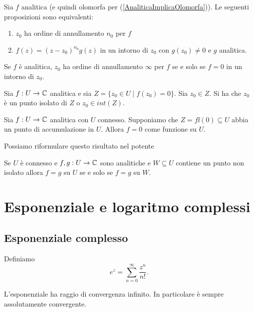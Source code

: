 \begin{multicols*}{2}
\begin{lemma}\label{CaratterizzazioneOrdineDiAnnullamento}
Sia $f$ analitica (e quindi olomorfa per (\ref{AnaliticaImplicaOlomorfa})). Le seguenti proposizioni sono equivalenti:
\begin{enumerate}[noitemsep]
\item $z_0$ ha ordine di annullamento $n_0$ per $f$
\item $f(z)=(z-z_0)^{n_0}g(z)$ in un intorno di $z_0$ con $g(z_0)\neq 0$ e $g$ analitica.
\end{enumerate}
\end{lemma}

\begin{remark}
Se $f$ \`e analitica, $z_0$ ha ordine di annullamento $\infty$ per $f$ se e solo se $f=0$ in un intorno di $z_0$.
\end{remark}


\begin{lemma}\label{ZeriAnaliticaSonoIsolatiOIntornoNullo}
Sia $f:U\to \mathbb{C}$ analitica e sia $Z=\{z_0\in U\mid f(z_0)=0\}$. Sia $z_0\in Z$. Si ha che $z_0$ \`e un punto isolato di $Z$ o $z_0\in int(Z)$.
\end{lemma}

\begin{theorem}\label{ZeriDiAnaliticaSonoIsolatiOCopronoLaComponenteConnessa}
Sia $f:U\to\mathbb{C}$ analitica con $U$ connesso. Supponiamo che $Z=f\ii(0)\subseteq U$ abbia un punto di accumulazione in $U$. Allora $f=0$ come funzione su $U$.
\end{theorem}
\noindent
Possiamo riformulare questo risultato nel potente
\begin{corollary}\label{LuogoDoveAnaliticheCoincidonoSonoIsolatiOCopronoLaComponenteConnessa}
Se $U$ \`e connesso e $f,g:U\to \mathbb{C}$ sono analitiche e $W\subseteq U$ contiene un punto non isolato allora $f=g$ su $U$ se e solo se $f=g$ su $W$.
\end{corollary}

\section{Esponenziale e logaritmo complessi}
\subsection{Esponenziale complesso}
\begin{definition}
Definiamo
\[e^z=\sum_{n=0}^\infty \frac{z^n}{n!}.\]
\end{definition}
\begin{remark}
L'esponenziale ha raggio di convergenza infinito. In particolare \`e sempre assolutamente convergente.
\end{remark}


\end{multicols*}
